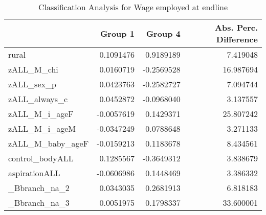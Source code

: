 \begin{table}

\caption{\label{tab:clanQempl}Classification Analysis for Wage employed at endline}
\centering
\begin{tabular}[t]{lrrr}
\toprule
  & Group 1 & Group 4 & Abs. Perc. Difference\\
\midrule
rural & 0.1091476 & 0.9189189 & 7.419048\\
zALL\_M\_chi & 0.0160719 & -0.2569528 & 16.987694\\
zALL\_sex\_p & 0.0423763 & -0.2582727 & 7.094744\\
zALL\_always\_c & 0.0452872 & -0.0968040 & 3.137557\\
zALL\_M\_i\_ageF & -0.0057619 & 0.1429371 & 25.807242\\
\addlinespace
zALL\_M\_i\_ageM & -0.0347249 & 0.0788648 & 3.271133\\
zALL\_M\_baby\_ageF & -0.0159213 & 0.1183678 & 8.434561\\
control\_bodyALL & 0.1285567 & -0.3649312 & 3.838679\\
aspirationALL & -0.0606986 & 0.1448469 & 3.386332\\
\_Bbranch\_na\_2 & 0.0343035 & 0.2681913 & 6.818183\\
\addlinespace
\_Bbranch\_na\_3 & 0.0051975 & 0.1798337 & 33.600001\\
\bottomrule
\end{tabular}
\end{table}
